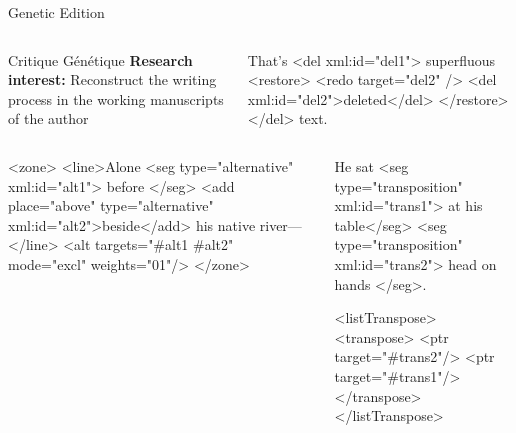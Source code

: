 \begin{frame}[fragile]{Genetic Edition}

\begin{columns}
\begin{block}{Critique Génétique}\footnotesize
\textbf{Research interest:} Reconstruct the writing process in the working manuscripts of the author
\end{block}

\begin{xmlcode}
That's <del xml:id="del1">
superfluous 
<restore>
 <redo target="del2" /> 
 <del xml:id="del2">deleted</del> 
</restore> </del>
text.
\end{xmlcode}
\end{columns}



\begin{columns}
\begin{xmlcode}
<zone>
 <line>Alone
  <seg type="alternative" 
   xml:id="alt1"> before </seg>
  <add place="above" 
       type="alternative"
       xml:id="alt2">beside</add> 
  his native river—
 </line>
 <alt targets="#alt1 #alt2" 
      mode="excl" weights="01"/>
</zone>
\end{xmlcode}
\begin{xmlcode}
He sat <seg type="transposition" 
xml:id="trans1"> at
his table</seg> 
<seg type="transposition"
xml:id="trans2"> head on hands
</seg>.

<listTranspose>
<transpose>
  <ptr target="#trans2"/>
  <ptr target="#trans1"/>
</transpose>
</listTranspose>
\end{xmlcode}
\end{columns}

\end{frame}


